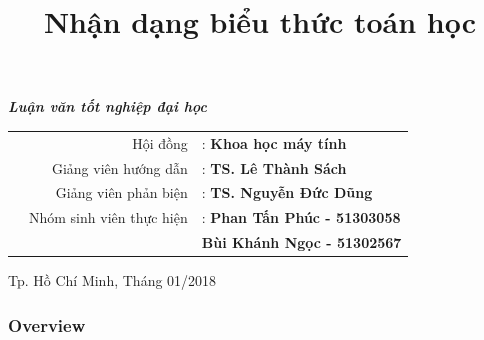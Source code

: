 \documentclass{beamer}
\title[Nhận dạng biểu thức toán học]{ Nhận dạng biểu thức toán học}
\author[Phan Tấn Phúc - Bùi Khánh Ngọc]{} %
\institute[BKU] %
{
	\bf{Đại học Bách Khoa Thành phố Hồ Chí Minh} \\ %
	\medskip
	\bf{Khoa Khoa Học và Kỹ Thuật Máy Tính}\\
	\medskip
	\textit{\{phantanphuc2512, buikhanhngoc142\}@gmail.com} %
}
\date[\today]{} %
\begin{document}
	\begin{frame}[plain]
		\maketitle
		\small
		{\centering\itshape \huge{\bf{Luận văn tốt nghiệp đại học}} \par}
		\footnotesize
		\begin{table}[c]
			\centering 
			\begin{tabular}{rrl}
				\hspace{1.5 cm} & Hội đồng & : \bf{Khoa học máy tính}\\
				\hspace{1.5 cm} & Giảng viên hướng dẫn & : \bf{TS. Lê Thành Sách}\\
				\hspace{1.5cm} & Giảng viên phản biện & : \bf{TS. Nguyễn Đức Dũng}\\
				\hspace{1.5 cm} & Nhóm sinh viên thực hiện & : \bf{Phan Tấn Phúc - 51303058}\\
				\hspace{1.5 cm} & \hspace{5 cm} &  \hspace{0.15cm} \bf{Bùi Khánh Ngọc - 51302567}\\
				
			\end{tabular}
		\end{table}
		\begin{center}
			{\footnotesize Tp. Hồ Chí Minh, Tháng 01/2018}
		\end{center}
	\end{frame}
	
	\begin{frame}
		\frametitle{Overview} %
	\end{frame}
	
\end{document}
